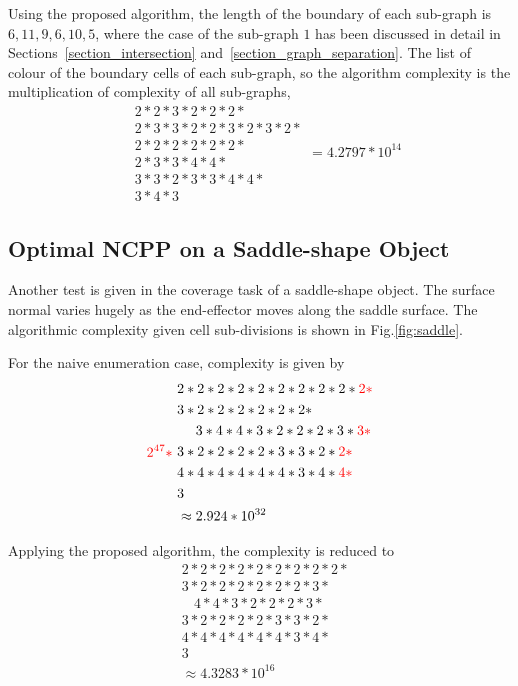 \documentclass[conference]{IEEEtran}
\begin{document}
Using the proposed algorithm, the length of the boundary of each sub-graph is $6, 11, 9, 6, 10, 5$, where the case of the sub-graph $1$ has been discussed in detail in Sections~\ref{section_intersection} and~\ref{section_graph_separation}. The list of colour of the boundary cells of each sub-graph, so the algorithm complexity is the multiplication of complexity of all sub-graphs, 
\begin{equation}
\begin{aligned}
&2*2*3*2*2*2*\\
&2*3*3*2*2*3*2*3*2*\\
&2*2*2*2*2*2*\\
&2*3*3*4*4*\\
&3*3*2*3*3*4*4*\\
&3*4*3
\end{aligned} = 4.2797*10^{14}
\end{equation}

\subsection{Optimal NCPP on a Saddle-shape Object}
Another test is given in the coverage task of a saddle-shape object. The surface normal varies hugely as the end-effector moves along the saddle surface. 
The algorithmic complexity given cell sub-divisions is shown in Fig.\ref{fig:saddle}.

For the  naive enumeration case, complexity is given by 
\begin{equation}
{\color{red}2^{47}*}~
\begin{aligned}
&2*2*2*2*2*2*2*2*2*{\color{red}2*}\\
&3*2*2*2*2*2*2* \\
&~~~~3* 4* 4*3* 2* 2* 2* 3*{\color{red}3*}\\
&3*2*2*2*2*3*3*2*{\color{red}2*}\\
&4* 4* 4* 4* 4* 4* 3* 4* {\color{red}4*}\\
&3\\
&\approx 2.924*10^{32}
\end{aligned}
\end{equation}

Applying the proposed algorithm, the complexity is reduced to
\begin{equation}
\begin{aligned}
&2*2*2*2*2*2*2*2*2*\\
&3*2*2*2*2*2*2* 3* \\
&~~~~4* 4*3* 2* 2* 2* 3*\\
&3*2*2*2*2*3*3*2*\\
&4* 4* 4* 4* 4* 4* 3* 4*\\
&3\\
&\approx 4.3283*10^{16}
\end{aligned}
\end{equation}
\end{document}
